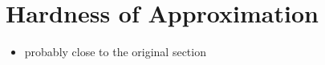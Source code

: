 \section{Hardness of Approximation}
\label{sec:hardness}

\begin{itemize}
	\item
	probably close to the original section
\end{itemize}

\lipsum[29-34]